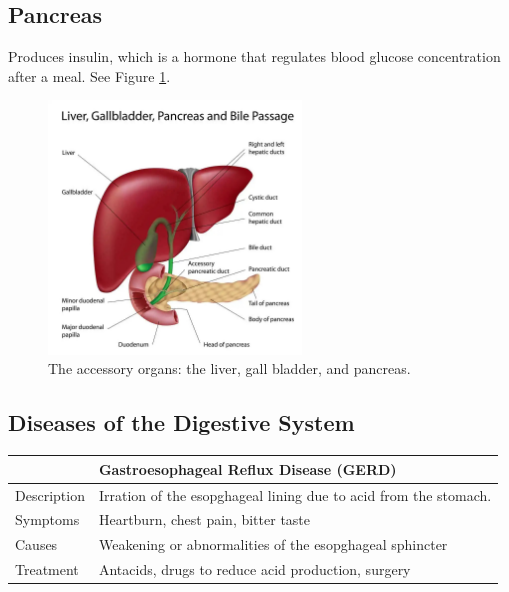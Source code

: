\documentclass[12pt]{report}
\begin{document}
\subsection{Pancreas}
\begin{definition}[Pancreas]
    Produces insulin, which is a hormone that regulates blood glucose concentration after a meal. See Figure \ref{fig:accessory-organs}.
\end{definition}

\begin{figure}[H]
\centering
    \includegraphics[width=0.6\textwidth]{../figures/accessory organs.jpg}
    \caption{The accessory organs: the liver, gall bladder, and pancreas.}
    \label{fig:accessory-organs}
\end{figure}

\subsection{Diseases of the Digestive System}
\begin{table}[h!]
    \renewcommand{\arraystretch}{1.5}
    \setlength{\tabcolsep}{10pt}
    \setlength{\arrayrulewidth}{0.25mm}

    \begin{center}
        \vspace{0.5em}
        \begin{tabular}{|l|l|}
        \hline
         & Gastroesophageal Reflux Disease (GERD) \\ 
        \hline
        Description & Irration of the esopghageal lining due to acid from the stomach. \\
        \hline
        Symptoms & Heartburn, chest pain, bitter taste\\ 
        \hline 
        Causes & Weakening or abnormalities of the esopghageal sphincter\\ 
        \hline 
        Treatment & Antacids, drugs to reduce acid production, surgery\\
        \hline
        \end{tabular}
    \end{center}
\end{table}
\end{document}
